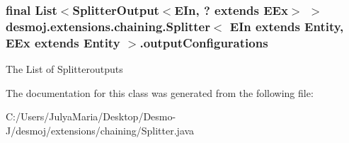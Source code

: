 \subsubsection[{output\-Configurations}]{\setlength{\rightskip}{0pt plus 5cm}final List$<$Splitter\-Output$<$E\-In, ? extends E\-Ex$>$ $>$ desmoj.\-extensions.\-chaining.\-Splitter$<$ E\-In extends {\bf Entity}, E\-Ex extends {\bf Entity} $>$.output\-Configurations\hspace{0.3cm}{\ttfamily [protected]}}\label{classdesmoj_1_1extensions_1_1chaining_1_1_splitter_3_01_e_in_01extends_01_entity_00_01_e_ex_01extends_01_entity_01_4_a5685d93c1ef18a330f938175243a1d6b}
The List of Splitteroutputs 

The documentation for this class was generated from the following file\-:\begin{DoxyCompactItemize}
\item 
C\-:/\-Users/\-Julya\-Maria/\-Desktop/\-Desmo-\/\-J/desmoj/extensions/chaining/Splitter.\-java\end{DoxyCompactItemize}
